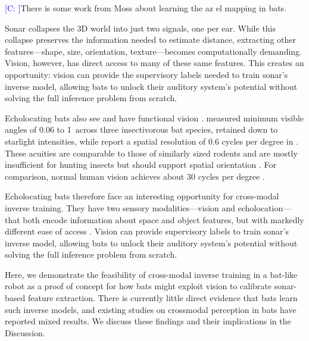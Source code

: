 \documentclass[11pt]{article}
\newcommand{\cnote}[2][]{\textcolor{blue}{[C#1: #2]}}
\begin{document}
\cnote{}{There is some work from Moss about learning the az el mapping in bats.}

Sonar collapses the 3D world into just two signals, one per ear. While this collapse preserves the information needed to estimate distance, extracting other features—shape, size, orientation, texture—becomes computationally demanding. Vision, however, has direct access to many of these same features. This creates an opportunity: vision can provide the supervisory labels needed to train sonar's inverse model, allowing bats to unlock their auditory system's potential without solving the full inference problem from scratch.

Echolocating bats also see and have functional vision \citep{Boonman2013,Hoffmann2019}. \citet{Bell1986} measured minimum visible angles of 0.06 to 1\textdegree\ across three insectivorous bat species, retained down to starlight intensities, while \citet{Cechetto2020} report a spatial resolution of 0.6 cycles per degree in . These acuities are comparable to those of similarly sized rodents \citep{DeSousa2022} and are mostly insufficient for hunting insects but should support spatial orientation \citep{Cechetto2023}. For comparison, normal human vision achieves about 30 cycles per degree \citep{DeSousa2022}.

Echolocating bats therefore face an interesting opportunity for cross-modal inverse training. They have two sensory modalities—vision and echolocation—that both encode information about space and object features, but with markedly different ease of access \citep[e.g.,][]{Holland2005,Page2021}. Vision can provide supervisory labels to train sonar's inverse model, allowing bats to unlock their auditory system's potential without solving the full inference problem from scratch.


Here, we demonstrate the feasibility of cross-modal inverse training in a bat-like robot as a proof of concept for how bats might exploit vision to calibrate sonar-based feature extraction. There is currently little direct evidence that bats learn such inverse models, and existing studies on crossmodal perception in bats have reported mixed results. We discuss these findings and their implications in the Discussion.
\end{document}
